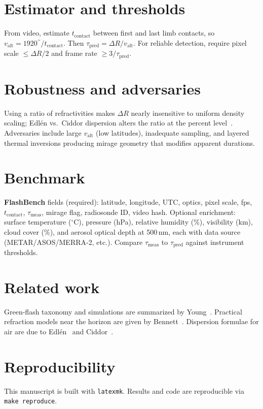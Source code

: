 \documentclass[11pt]{article}
\newcommand{\arcsec}{\ensuremath{^{\prime\prime}}}
\begin{document}
\section{Estimator and thresholds}
From video, estimate $t_{\mathrm{contact}}$ between first and last limb contacts, so $v_{\mathrm{alt}}=1920\arcsec/t_{\mathrm{contact}}$. Then $\tau_{\mathrm{pred}}=\Delta R/v_{\mathrm{alt}}$. For reliable detection, require pixel scale $\le \Delta R/2$ and frame rate $\ge 3/\tau_{\mathrm{pred}}$.

\section{Robustness and adversaries}
Using a ratio of refractivities makes $\Delta R$ nearly insensitive to uniform density scaling; Edl\'en vs.\ Ciddor dispersion alters the ratio at the percent level~\cite{Edlen1966,Ciddor1996}. Adversaries include large $v_{\mathrm{alt}}$ (low latitudes), inadequate sampling, and layered thermal inversions producing mirage geometry that modifies apparent durations.

\section{Benchmark}
\textbf{FlashBench} fields (required): latitude, longitude, UTC, optics, pixel scale, fps, $t_{\mathrm{contact}}$, $\tau_{\mathrm{meas}}$, mirage flag, radiosonde ID, video hash.
Optional enrichment: surface temperature ($^\circ$C), pressure (hPa), relative humidity (\%), visibility (km), cloud cover (\%), and aerosol optical depth at 500\,nm, each with data source (METAR/ASOS/MERRA-2, etc.). Compare $\tau_{\mathrm{meas}}$ to $\tau_{\mathrm{pred}}$ against instrument thresholds.

\section{Related work}
Green-flash taxonomy and simulations are summarized by Young~\cite{YoungJOSA,YoungSim}. Practical refraction models near the horizon are given by Bennett~\cite{Bennett1982}. Dispersion formulae for air are due to Edl\'en~\cite{Edlen1966} and Ciddor~\cite{Ciddor1996}.

\section{Reproducibility}
This manuscript is built with \texttt{latexmk}. Results and code are reproducible via \texttt{make reproduce}.
\end{document}
